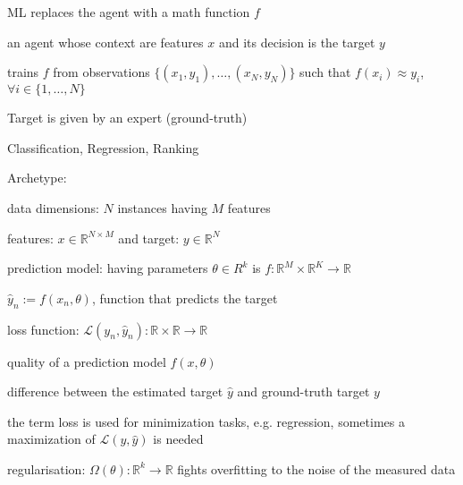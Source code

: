 \documentclass[landscape, a4paper]{article}
\begin{document}
\fontsize{3pt}{3pt}\selectfont

\begin{minipage}[t]{0.2\linewidth}
	\begin{betterlist}
		\item ML \alert{replaces the agent} with a math function $f$
		\begin{betterlist}
			\item an agent whose context are \alert{features} $x$ and its decision is the \alert{target} $y$
			\item \alert{trains} $f$ from \alert{observations} $\{(x_1 , y_1), \ldots , (x_N , y_N )\}$  such that $f(x_i) \approx y_i$, $\forall i \in \{1, \ldots , N\}$
		\end{betterlist}
	\end{betterlist}
	\fbox{Supervised Learning}
	\begin{betterlist}
		\item Target is given by an expert (ground-truth)
		\item Classification, Regression, Ranking
		\item \alert{Archetype:}
		\begin{betterlist}
			\item \alert{data dimensions:} $N$ instances having $M$ features
			\item \alert{features:} $x \in \mathbb{R}^{N\times M}$ and \alert{target:} $y \in \mathbb{R}^N$
			\item \alert{prediction model:} having parameters $ \theta \in R^k$ is $f:\mathbb{R}^M\times \mathbb{R}^K \rightarrow \mathbb{R}$
			\begin{betterlist}
				\item $\hat y_n := f(x_n, \theta)$, function that predicts the target
			\end{betterlist}
			\item \alert{loss function:} $\mathcal{L}(y_n, \hat y_n): \mathbb{R}\times\mathbb{R}\rightarrow \mathbb{R}$
			\begin{betterlist}
				\item quality of a prediction model $f(x, \theta)$
				\item difference between the \alert{estimated target} $\hat y$ and \alert{ground-truth target} $y$
				\item the term loss is used for minimization tasks, e.g. regression, sometimes a maximization of $\mathcal{L}(y, \hat y)$ is needed
			\end{betterlist}
			\item \alert{regularisation:} $\Omega(\theta): \mathbb{R}^k \rightarrow \mathbb{R}$ fights overfitting to the noise of the measured data

\end{betterlist}
\end{betterlist}
\end{minipage}
\end{document}
